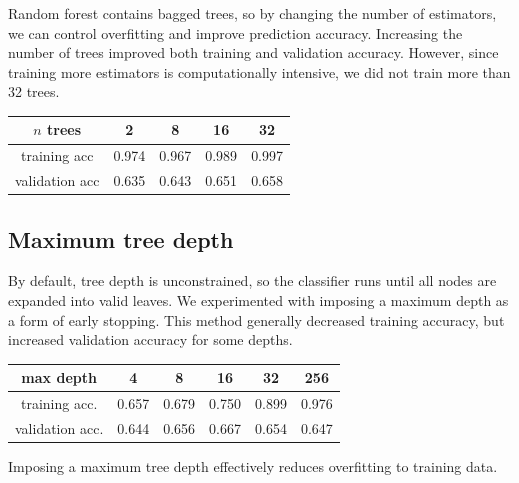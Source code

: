 \documentclass{article}
\begin{document}
\begin{multicols}{2}
Random forest contains bagged trees,
so by changing the number of estimators,
we can control overfitting and improve prediction accuracy.
Increasing the number of trees
improved both training and validation accuracy.
However, since training more estimators
is computationally intensive,
we did not train more than 32 trees.
%
%
%
\begin{center}
    \begin{tabular}{c|c c c c}
        $n$ trees
        		& 2 & 8 & 16 & 32 \\\hline
        training acc
        		& 0.974 & 0.967 & 0.989 & 0.997\\
        validation acc
        		& 0.635 & 0.643 & 0.651 & 0.658
    \end{tabular}
\end{center}

\subsection{Maximum tree depth}

By default, tree depth is unconstrained,
so the classifier runs until all nodes
are expanded into valid leaves.
We experimented with imposing a maximum depth
as a form of early stopping.
This method generally decreased training accuracy,
but increased validation accuracy
for some depths.
%
%
%
%
%
\begin{center}
    \begin{tabular}{c|ccccc}
        max depth &
          4 & 8 & 16 & 32 & 256 \\\hline
        training acc. &
          0.657 & 0.679 & 0.750 & 0.899 & 0.976\\
        validation acc. &
          0.644 & 0.656 & 0.667 & 0.654 & 0.647
    \end{tabular}
\end{center}
Imposing a maximum tree depth effectively
reduces overfitting to training data.


\end{multicols}
\end{document}
